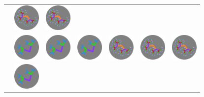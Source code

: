 \documentclass[
  letterpaper,
  DIV=11,
  numbers=noendperiod,
  oneside]{scrreprt}
\begin{document}
\begin{longtable}[]{@{}lllllll@{}}
&
\includegraphics[width=\linewidth,height=0.52083in,keepaspectratio]{images/fractal-high.png}
&
\includegraphics[width=\linewidth,height=0.52083in,keepaspectratio]{images/fractal-high.png} \\
&
\includegraphics[width=\linewidth,height=0.52083in,keepaspectratio]{images/fractal-low.png}
&
\includegraphics[width=\linewidth,height=0.52083in,keepaspectratio]{images/fractal-low.png}
&
\includegraphics[width=\linewidth,height=0.52083in,keepaspectratio]{images/fractal-low.png}
&
\includegraphics[width=\linewidth,height=0.52083in,keepaspectratio]{images/fractal-high.png}
&
\includegraphics[width=\linewidth,height=0.52083in,keepaspectratio]{images/fractal-high.png}
&
\includegraphics[width=\linewidth,height=0.52083in,keepaspectratio]{images/fractal-high.png} \\
&
\includegraphics[width=\linewidth,height=0.52083in,keepaspectratio]{images/fractal-low.png}

\end{longtable}
\end{document}
